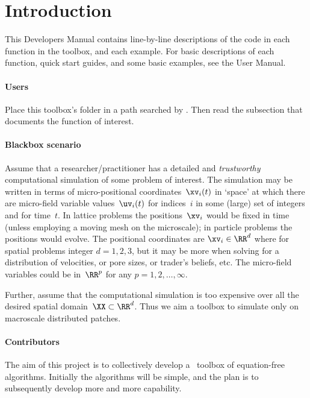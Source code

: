 \section{Introduction}

\localtableofcontents

\begin{devMan}
This Developers Manual contains line-by-line descriptions of the code in each function in the toolbox, and each example.  For basic descriptions of each function, quick start guides, and some basic examples, see the User Manual.
\end{devMan}

\paragraph{Users}
Place this toolbox's folder in a path searched by \script.
Then read the subsection that documents the function of interest.


\paragraph{Blackbox scenario}
Assume that a researcher\slash practitioner has a detailed and \emph{trustworthy} computational simulation of some problem of interest.
The simulation may be written in terms of micro-positional coordinates~\(\xv_i(t)\) in `space' at which there are micro-field variable values~\(\uv_i(t)\) for indices~\(i\) in some (large) set of integers and for time~\(t\).
In lattice problems the positions~\(\xv_i\) would be fixed in time (unless employing a moving mesh on the microscale); in particle problems the positions would evolve.
The positional coordinates are \(\xv_i\in\RR^{d}\) where for spatial problems integer \(d=1,2,3\), but it may be more when solving for a distribution of velocities, or pore sizes, or trader's beliefs, etc.
The micro-field variables could be in~\(\RR^{p}\) for any \(p=1,2,\ldots,\infty\).

Further, assume that the computational simulation is too expensive over all the desired spatial domain~\(\XX\subset\RR^{d}\).
Thus we aim a toolbox to simulate only on macroscale distributed patches.



\paragraph{Contributors}
The aim of this project is to collectively develop a \script\ toolbox of equation-free algorithms.
Initially the algorithms will be simple, and the plan is to subsequently develop more and more capability.

